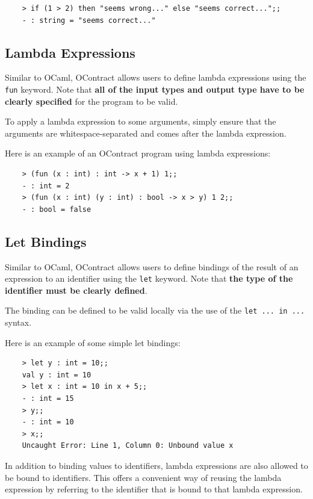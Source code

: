 \documentclass[a4paper]{article}
\begin{document}
\begin{verbatim}
    > if (1 > 2) then "seems wrong..." else "seems correct...";;
    - : string = "seems correct..."
\end{verbatim}

\subsection{Lambda Expressions}

Similar to OCaml, OContract allows users to define lambda expressions using the \texttt{fun} keyword.
Note that \textbf{all of the input types and output type have to be clearly specified} for the program to be valid.

To apply a lambda expression to some arguments, simply ensure that the arguments are whitespace-separated and comes after the lambda expression.

Here is an example of an OContract program using lambda expressions:

\begin{verbatim}
    > (fun (x : int) : int -> x + 1) 1;;
    - : int = 2
    > (fun (x : int) (y : int) : bool -> x > y) 1 2;;
    - : bool = false
\end{verbatim}

\subsection{Let Bindings}

Similar to OCaml, OContract allows users to define bindings of the result of an expression to an identifier using the \texttt{let} keyword.
Note that \textbf{the type of the identifier must be clearly defined}.

The binding can be defined to be valid locally via the use of the \texttt{let ... in ...} syntax.

Here is an example of some simple let bindings:

\begin{verbatim}
    > let y : int = 10;;
    val y : int = 10
    > let x : int = 10 in x + 5;;
    - : int = 15
    > y;;
    - : int = 10
    > x;;
    Uncaught Error: Line 1, Column 0: Unbound value x
\end{verbatim}

In addition to binding values to identifiers, lambda expressions are also allowed to be bound to identifiers.
This offers a convenient way of reusing the lambda expression by referring to the identifier that is bound to that lambda expression.
\end{document}
